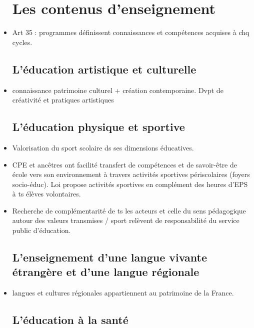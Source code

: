 \documentclass[12pt]{report}
\begin{document}
\begin{itemize}
\chapter{Les contenus d'enseignement}

\item Art 35 : programmes définissent connaissances et compétences acquises à chq cycles. \\

\section{L'éducation artistique et culturelle}

\item connaissance patrimoine culturel + création contemporaine. Dvpt de créativité et pratiques artistiques \\

\section{L'éducation physique et sportive}

\item Valorisation du sport scolaire ds ses dimensions éducatives. \\

\item CPE et ancêtres ont facilité transfert de compétences et de savoir-être de école vers son environnement à travers activités sportives périscolaires (foyers socio-éduc). Loi propose activités sportives en complément des heures d'EPS à ts élèves volontaires. \\

\item Recherche de complémentarité de ts les acteurs et celle du sens pédagogique autour des valeurs transmises / sport relèvent de responsabilité du service public d'éducation. \\

\section{L'enseignement d'une langue vivante étrangère et d'une langue régionale}

\item langues et cultures régionales appartiennent au patrimoine de la France.

\section{L'éducation à la santé}


\end{itemize}
\end{document}
